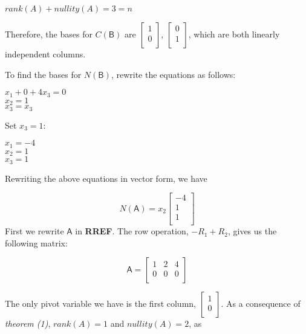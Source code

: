 \documentclass[a4paper, 11pt]{article}
\newcommand{\mat}[1]{\boldsymbol { \mathsf{#1}} }
\begin{document}
\begin{enumerate}
    $rank(A) + nullity(A) = 3 = n$


Therefore, the bases for $C(\mat{B})$ are $\begin{bmatrix}
1 \\
0 \\
\end{bmatrix}$, $\begin{bmatrix}
0 \\
1 \\
\end{bmatrix}$, which are both linearly independent columns.

To find the bases for $N(\mat{B})$, rewrite the equations as follows:
\begin{center}
    $x_1 + 0 + 4x_3 = 0$ \\
    $x_2 = 1$ \\ 
    $x_3 = x_3$ 
\end{center}

Set $x_3 = 1$:

\begin{center}
    $x_1  = -4$ \\
    $x_2 = 1$ \\
    $x_3 = 1$ \\
\end{center}


Rewriting the above equations in vector form, we have

\begin{equation*}
    N(\mat{A}) = x_2 
    \begin{bmatrix}
    -4 \\
    1 \\
    1 \\
    \end{bmatrix}
\end{equation*}First we rewrite $\mat{A}$ in \textbf{RREF}. The row operation, $-R_1 + R_2$, gives us the following matrix:

\begin{equation*}
    \mat{A} = 
    \begin{bmatrix}
    1 & 2 & 4 \\
    0 & 0 & 0 \\
    \end{bmatrix}
\end{equation*}

The only pivot variable we have is the first column, $\begin{bmatrix}
1 \\
0 \\
\end{bmatrix}$. As a consequence of \textit{theorem (1)}, $rank(A) = 1$ and $nullity(A) = 2$, as 


\end{enumerate}
\end{document}
